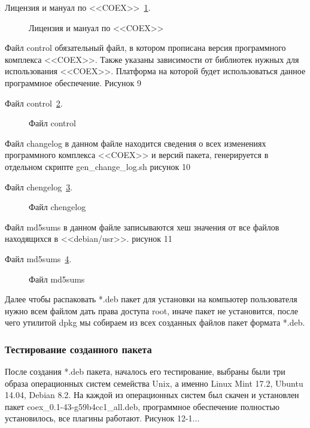 Лицензия и мануал по <<COEX>>~\ref{LIcenzMan:LIcenzMan}.

\begin{figure}[h!]
\caption{ Лицензия и мануал по <<COEX>> }
\label{LIcenzMan:LIcenzMan}
\end{figure}

Файл control обязательный файл, в котором прописана версия программного комплекса <<COEX>>. Также указаны зависимости от библиотек нужных для использования <<COEX>>. Платформа на которой будет использоваться данное программное обеспечение. Рисунок 9

Файл control~\ref{control:control}.

\begin{figure}[h!]
\caption{ Файл control }
\label{control:control}
\end{figure}

Файл changelog в данном файле находится сведения о всех изменениях программного комплекса <<COEX>> и версий пакета, генерируется в отдельном скрипте gen\_change\_log.sh рисунок 10

Файл chengelog~\ref{chengelog:chengelog}.

\begin{figure}[h!]
\caption{ Файл chengelog }
\label{chengelog:chengelog}
\end{figure}

Файл md5sums в данном файле записываются хеш значения от все файлов находящихся в <<debian/usr>>. рисунок 11

Файл md5sums~\ref{md5sums:md5sums}.

\begin{figure}[h!]
\caption{ Файл md5sums }
\label{md5sums:md5sums}
\end{figure}

Далее чтобы распаковать *.deb пакет для установки на компьютер пользователя нужно всем файлом дать права доступа root, иначе пакет не установится, после чего утилитой dpkg мы собираем из всех созданных файлов пакет формата *.deb. 

\subsubsection{Тестирование созданного пакета}

После создания *.deb пакета, началось его тестирование, выбраны были три образа операционных систем семейства Unix, а именно Linux Mint 17.2, Ubuntu 14.04, Debian 8.2. На каждой из операционных систем был скачен и установлен пакет coex\_0.1-43-g59b4cc1\_all.deb, программное обеспечение полностью установилось, все плагины работают. Рисунок 12-1...

